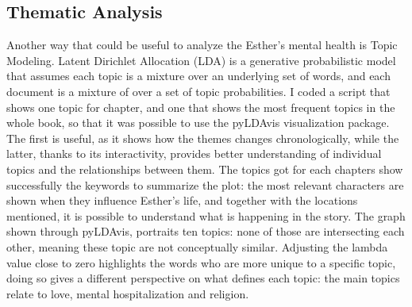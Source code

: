 \documentclass[11pt]{article}
\begin{document}
\subsection{Thematic Analysis}

Another way that could be useful to analyze the Esther’s mental health is Topic Modeling. Latent Dirichlet Allocation (LDA) is a generative probabilistic model that assumes each topic is a mixture over an underlying set of words, and each document is a mixture of over a set of topic probabilities. I coded a script that shows one topic for chapter, and one that shows the most frequent topics in the whole book, so that it was possible to use the pyLDAvis visualization package. The first is useful, as it shows how the themes changes chronologically, while the latter, thanks to its interactivity, provides better understanding of individual topics and the relationships between them. 
The topics got for each chapters show successfully the keywords to summarize the plot: the most relevant characters are shown when they influence Esther’s life, and together with the locations mentioned, it is possible to understand what is happening in the story.
The graph shown through pyLDAvis, portraits ten topics: none of those are intersecting each other, meaning these topic are not conceptually similar. Adjusting the lambda value close to zero highlights the words who are more unique to a specific topic, doing so gives a different perspective on what defines each topic: the main topics relate to love, mental hospitalization and religion.
\end{document}
